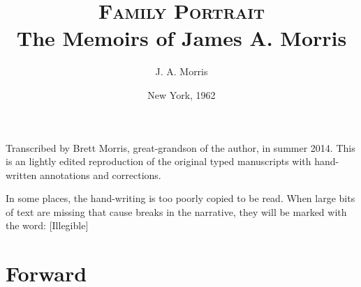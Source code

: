 \documentclass[12pt]{book}              %
\title{\textsc{Family Portrait}\\ The Memoirs of James A. Morris}    %
\author{J. A. Morris}              %
\date{New York, 1962}                           %
\begin{document}
\frontmatter                            %

Transcribed by Brett Morris, great-grandson of the author, in summer 2014. This is an lightly edited reproduction of the original typed manuscripts with hand-written annotations and corrections. 

In some places, the hand-writing is too poorly copied to be read. When large bits of text are missing that cause breaks in the narrative, they will be marked with the word: [Illegible]

\maketitle                              %
\tableofcontents                        %
\mainmatter                             %
\chapter*{Forward}                %
% 
\end{document}
